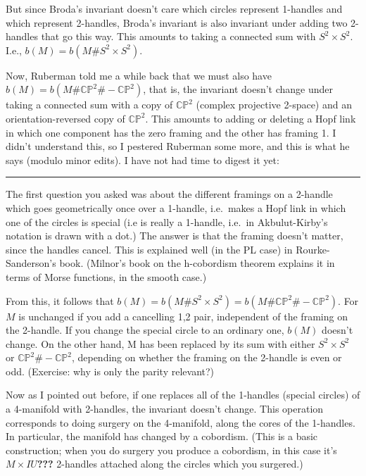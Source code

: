 \documentclass{article}
\begin{document}
But since Broda's invariant doesn't care which circles represent
1-handles and which represent 2-handles, Broda's invariant is also
invariant under adding two 2-handles that go this way. This amounts to
taking a connected sum with \(S^2 \times S^2\). I.e.,
\(b(M) = b(M\# S^2 \times S^2)\).

Now, Ruberman told me a while back that we must also have
\(b(M) = b(M\#\mathbb{CP}^2\#-\mathbb{CP}^2)\), that is, the invariant
doesn't change under taking a connected sum with a copy of
\(\mathbb{CP}^2\) (complex projective 2-space) and an
orientation-reversed copy of \(\mathbb{CP}^2\). This amounts to adding
or deleting a Hopf link in which one component has the zero framing and
the other has framing 1. I didn't understand this, so I pestered
Ruberman some more, and this is what he says (modulo minor edits). I
have not had time to digest it yet:

\begin{center}\rule{0.5\linewidth}{0.5pt}\end{center}

The first question you asked was about the different framings on a
2-handle which goes geometrically once over a 1-handle, i.e.~makes a
Hopf link in which one of the circles is special (i.e is really a
1-handle, i.e.~in Akbulut-Kirby's notation is drawn with a dot.) The
answer is that the framing doesn't matter, since the handles cancel.
This is explained well (in the PL case) in Rourke-Sanderson's book.
(Milnor's book on the h-cobordism theorem explains it in terms of Morse
functions, in the smooth case.)

From this, it follows that
\(b(M) = b(M\#S^2 \times S^2) = b(M\#\mathbb{CP}^2\#-\mathbb{CP}^2)\).
For \(M\) is unchanged if you add a cancelling 1,2 pair, independent of
the framing on the 2-handle. If you change the special circle to an
ordinary one, \(b(M)\) doesn't change. On the other hand, M has been
replaced by its sum with either \(S^2 \times S^2\) or
\(\mathbb{CP}^2 \# -\mathbb{CP}^2\), depending on whether the framing on
the 2-handle is even or odd. (Exercise: why is only the parity
relevant?)

Now as I pointed out before, if one replaces all of the 1-handles
(special circles) of a 4-manifold with 2-handles, the invariant doesn't
change. This operation corresponds to doing surgery on the 4-manifold,
along the cores of the 1-handles. In particular, the manifold has
changed by a cobordism. (This is a basic construction; when you do
surgery you produce a cobordism, in this case it's
\(M \times I U\)\textbf{???} 2-handles attached along the circles which
you surgered.)
\end{document}
